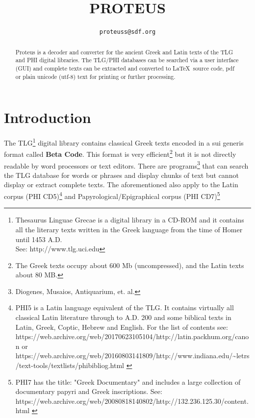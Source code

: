 \documentclass[11pt,a4paper]{article}
\title{PROTEUS}
\author{\tt {\small proteuss@sdf.org}}
\begin{document}
  \maketitle
\begin{abstract}
\noindent
  Proteus is a decoder and converter for the ancient Greek and Latin
  texts of the TLG and PHI digital libraries.
  The TLG/PHI databases can be searched via a user interface (GUI) and
  complete texts can be extracted and converted to \LaTeX\ source code, pdf
  or plain unicode (utf-8) text for printing or further processing.
\end{abstract}
  \tableofcontents
\section{Introduction}
  The TLG\footnote{Thesaurus Linguae Grecae is a digital library in a CD-ROM
  and it contains all the literary texts written
  in the Greek language from the time of Homer until 1453 A.D.\\
  See: http://www.tlg.uci.edu } digital library contains classical Greek
  texts encoded in a sui generis
  format called {\bf Beta Code}.  This format is very
  efficient\footnote{The Greek texts occupy about
                     600 Mb (uncompressed),
                     and the Latin texts about 80 MB.}
  but it is not  directly readable by word
  processors or text editors.  There are programs\footnote{Diogenes, Musaios,
  Antiquarium, et. al.} that can search the TLG database for words
  or phrases and display chunks of text but cannot display or extract
  complete texts.
  The aforementioned also apply to the Latin corpus
  (PHI CD5)\footnote{
                  PHI5 is a Latin language equivalent of the TLG.
                  It contains virtually all classical Latin literature
                  through to A.D. 200 and some biblical texts in Latin,
                  Greek, Coptic, Hebrew and English. For the list of contents see:\\
                  {\tiny https://web.archive.org/web/20170623105104/http://latin.packhum.org/canon
                    or\\
                  https://web.archive.org/web/20160803141809/http://www.indiana.edu/\textasciitilde letrs/text-tools/textlists/phibibliog.html }
                   }
  and Papyrological/Epigraphical corpus
  (PHI CD7)\footnote{
                       PHI7 has the title: "Greek Documentary" and includes
                       a large collection of documentary papyri
                       and Greek inscriptions. See:\\
                       {\tiny https://web.archive.org/web/20080818140802/http://132.236.125.30/content.html }
                        }
\end{document}
